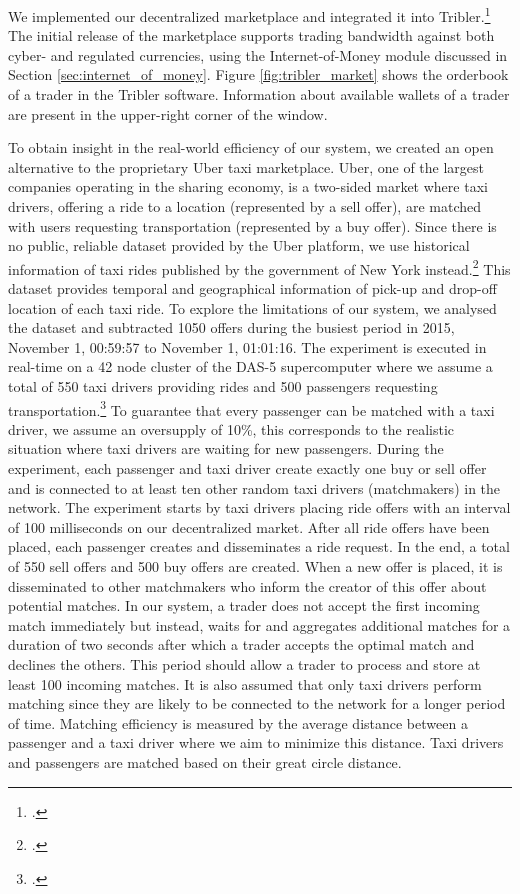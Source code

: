 \documentclass[USenglish]{article}
\begin{document}
We implemented our decentralized marketplace and integrated it into Tribler.\footcite{pouwelse2008tribler}
The initial release of the marketplace supports trading bandwidth against both cyber- and regulated currencies, using the Internet-of-Money module discussed in Section \ref{sec:internet_of_money}.
Figure \ref{fig:tribler_market} shows the orderbook of a trader in the Tribler software.
Information about available wallets of a trader are present in the upper-right corner of the window.

To obtain insight in the real-world efficiency of our system, we created an open alternative to the proprietary Uber taxi marketplace.
Uber, one of the largest companies operating in the sharing economy, is a two-sided market where taxi drivers, offering a ride to a location (represented by a sell offer), are matched with users requesting transportation (represented by a buy offer).
Since there is no public, reliable dataset provided by the Uber platform, we use historical information of taxi rides published by the government of New York instead.\footcite{newyorktaxi}
This dataset provides temporal and geographical information of pick-up and drop-off location of each taxi ride.
To explore the limitations of our system, we analysed the dataset and subtracted 1050 offers during the busiest period in 2015, November 1, 00:59:57 to November 1, 01:01:16.
The experiment is executed in real-time on a 42 node cluster of the DAS-5 supercomputer where we assume a total of 550 taxi drivers providing rides and 500 passengers requesting transportation.\footcite{bal2016medium}
To guarantee that every passenger can be matched with a taxi driver, we assume an oversupply of 10\%, this corresponds to the realistic situation where taxi drivers are waiting for new passengers.
During the experiment, each passenger and taxi driver create exactly one buy or sell offer and is connected to at least ten other random taxi drivers (matchmakers) in the network.
The experiment starts by taxi drivers placing ride offers with an interval of 100 milliseconds on our decentralized market.
After all ride offers have been placed, each passenger creates and disseminates a ride request.
In the end, a total of 550 sell offers and 500 buy offers are created.
When a new offer is placed, it is disseminated to other matchmakers who inform the creator of this offer about potential matches.
In our system, a trader does not accept the first incoming match immediately but instead, waits for and aggregates additional matches for a duration of two seconds after which a trader accepts the optimal match and declines the others.
This period should allow a trader to process and store at least 100 incoming matches.
It is also assumed that only taxi drivers perform matching since they are likely to be connected to the network for a longer period of time.
Matching efficiency is measured by the average distance between a passenger and a taxi driver where we aim to minimize this distance.
Taxi drivers and passengers are matched based on their great circle distance.
\end{document}
